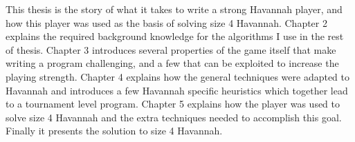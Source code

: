 This thesis is the story of what it takes to write a strong Havannah player, and how this player was used as the basis of solving size 4 Havannah. Chapter 2 explains the required background knowledge for the algorithms I use in the rest of thesis. Chapter 3 introduces several properties of the game itself that make writing a program challenging, and a few that can be exploited to increase the playing strength. Chapter 4 explains how the general techniques were adapted to Havannah and introduces a few Havannah specific heuristics which together lead to a tournament level program. Chapter 5 explains how the player was used to solve size 4 Havannah and the extra techniques needed to accomplish this goal. Finally it presents the solution to size 4 Havannah.


